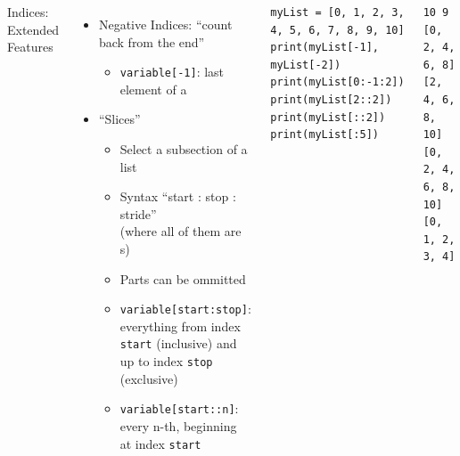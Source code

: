 \begin{frame}[fragile]
%
\begin{columns}[t]
\begin{Large}
{Indices: Extended Features}
\vspace{6pt}
\end{Large}
\begin{itemize}
\item Negative Indices: \enquote{count back from the end}
	\begin{itemize}
	\item \texttt{variable[-1]}: last element of a 
	\end{itemize}
\item \enquote{Slices}
	\begin{itemize}
	\item Select a subsection of a list
	\item Syntax \enquote{start : stop : stride} \\
		(where all of them are s)
	\item Parts can be ommitted
	\item \texttt{variable[start:stop]}: everything from index \texttt{start} (inclusive) and up to index \texttt{stop} (exclusive)
	\item \texttt{variable[start::n]}: every n-th, beginning at index \texttt{start}
	\end{itemize}
\end{itemize}
%
\begin{codebox}
\begin{verbatim}
myList = [0, 1, 2, 3, 4, 5, 6, 7, 8, 9, 10]
print(myList[-1], myList[-2])
print(myList[0:-1:2])
print(myList[2::2])
print(myList[::2])
print(myList[:5])
\end{verbatim}
\end{codebox}
%
\begin{cmdbox}[Output]
\begin{verbatim}
10 9
[0, 2, 4, 6, 8]
[2, 4, 6, 8, 10]
[0, 2, 4, 6, 8, 10]
[0, 1, 2, 3, 4]
\end{verbatim}
\end{cmdbox}\end{columns}
%
\end{frame}


